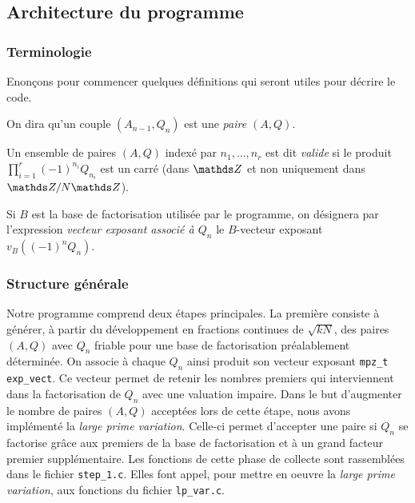 \subsection{Architecture du programme}

\subsubsection{Terminologie}

Enonçons pour commencer quelques définitions qui seront utiles pour décrire le code.


\begin{definition}
	On dira qu'un couple $(A_{n-1}, Q_n)$ est une \emph{paire $(A, Q)$}.
\end{definition}

\begin{definition}
	Un ensemble de paires $(A, Q)$ indexé par $n_1, \dots, n_r$ est dit
	\emph{valide} si le produit $\prod_{i=1}^r (-1)^{n_i} Q_{n_i}$ est un carré
	(dans $\Z$ et non uniquement dans $\Z/N\Z$).
\end{definition}

\begin{definition}
    Si $B$ est la base de factorisation utilisée par le programme, on 
    désignera par l'expression \emph{vecteur exposant associé à $Q_n$} 
    le $B$-vecteur exposant $v_B((-1)^n Q_n)$.
\end{definition}

\subsubsection{Structure générale}

Notre programme comprend deux étapes principales. La première consiste à générer, 
à partir du développement en fractions continues de $ \sqrt{kN} $, des paires 
$(A, Q)$ avec $Q_n$ friable pour une base de factorisation préalablement déterminée.
On associe à chaque $Q_n$ ainsi produit son vecteur exposant \texttt{mpz\_t exp\_vect}.
Ce vecteur permet de retenir les nombres premiers qui interviennent dans la 
factorisation de $Q_n$ avec une valuation impaire. Dans le but d'augmenter le nombre
de paires $(A,Q) $ acceptées lors de cette étape, nous avons implémenté la 
\textit{large prime variation}. Celle-ci permet d'accepter une paire si $Q_n$ se
factorise  grâce aux premiers de la base de factorisation et à un grand facteur
premier supplémentaire. Les fonctions de cette phase de collecte sont rassemblées
dans le fichier \texttt{step\_1.c}. Elles font appel, pour mettre en oeuvre la 
\textit{large prime variation}, aux fonctions du fichier \texttt{lp\_var.c}. \\
 
